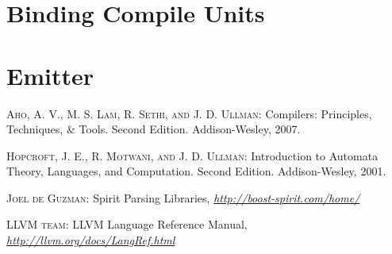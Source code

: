\documentclass[a4paper,oneside,11pt]{book}
\theoremstyle{definition}
\begin{document}
\chapter{Binding Compile Units}

\chapter{Emitter}

\clearpage
\begin{thebibliography}{4}

 \textsc{Aho, A. V., M. S. Lam, R. Sethi, and J. D. Ullman}:
Compilers: Principles, Techniques, \& Tools. Second Edition. Addison-Wesley, 2007.

 \textsc{Hopcroft, J. E., R. Motwani, and J. D. Ullman}:
Introduction to Automata Theory, Languages, and Computation. Second Edition. Addison-Wesley, 2001.

 \textsc{Joel de Guzman}:
Spirit Parsing Libraries,
\textit{\url{http://boost-spirit.com/home/}}

 \textsc{LLVM team}:
LLVM Language Reference Manual,
\textit{\url{http://llvm.org/docs/LangRef.html}}

\end{thebibliography}
\end{document}
